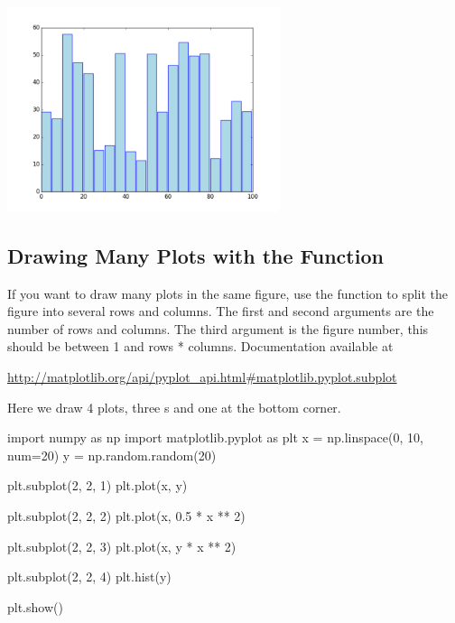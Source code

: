 \documentclass[11pt]{cselabheader}
\begin{document}
\begin{center}
\includegraphics[width=0.6\textwidth]{img/matplotlib_bar.png}
\end{center}

\subsection{Drawing Many Plots with the 
Function}

If you want to draw many plots in the same figure, use the
 function to split the figure into several rows
and columns. The first and second arguments are the number of rows and columns.
The third argument is the figure number, this should be between 1 and
rows * columns. Documentation available at

\begin{center}
\url{http://matplotlib.org/api/pyplot_api.html#matplotlib.pyplot.subplot}
\end{center}

Here we draw 4 plots, three s and one
 at the bottom corner.

\begin{python3code}
import numpy as np
import matplotlib.pyplot as plt
x = np.linspace(0, 10, num=20)
y = np.random.random(20)

plt.subplot(2, 2, 1)
plt.plot(x, y)

plt.subplot(2, 2, 2)
plt.plot(x, 0.5 * x ** 2)

plt.subplot(2, 2, 3)
plt.plot(x, y * x ** 2)

plt.subplot(2, 2, 4)
plt.hist(y)

plt.show()
\end{python3code}
\end{document}
